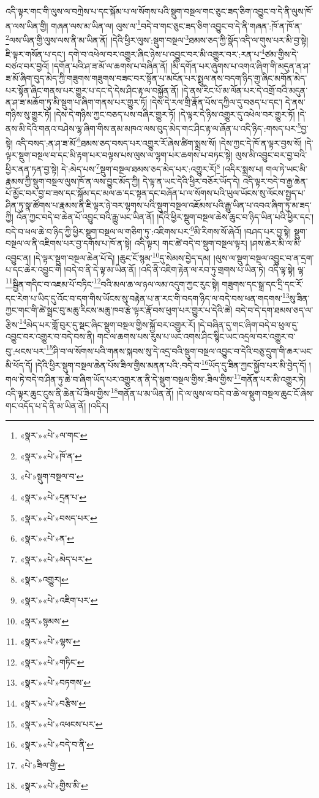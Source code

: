 འདི་ལྟར་གང་གི་ལུས་ལ་བཀྲེས་པ་དང་སྐོམ་པ་ལ་སོགས་པའི་སྡུག་བསྔལ་གང་ཅུང་ཟད་ཅིག་འབྱུང་བ་དེ་ནི་ལུས་ཁོ་ན་ལས་ཡིན་གྱི། གཞན་ལས་མ་ཡིན་ལ། ལུས་ལ་\footnote{«སྣར་»«པེ་»ལ་གང་}བདེ་བ་གང་ཅུང་ཟད་ཅིག་འབྱུང་བ་དེ་ནི་གཞན་:ཁོ་ན་ཁོ་ན་\footnote{«སྣར་»«པེ་»ཁོ་ན་}ལས་ཡིན་གྱི་ལུས་ལས་ནི་མ་ཡིན་ནོ། །དེའི་ཕྱིར་ལུས་:སྡུག་བསྔལ་\footnote{«པེ་»སྡུག་བསྔལ་བ་}ཐམས་ཅད་ཀྱི་སྣོད་འདི་ལ་གུས་པར་མི་བྱ་སྟེ། ཇི་ལྟར་གསོན་པ་དང་། དགེ་བ་འཕེལ་བར་འགྱུར་ཞིང་ཉེས་པ་འབྱུང་བར་མི་འགྱུར་བར་:རན་པ་\footnote{«སྣར་»«པེ་»དྲན་པ་}ཙམ་གྱིས་དེ་བཙའ་བར་བྱའོ། །དགོན་པའི་ཤ་ཟ་མོ་ལ་ཆགས་པ་བཞིན་ནོ། །མི་དགོན་པར་ཞུགས་པ་འགའ་ཞིག་གི་མདུན་ན་ཤ་ཟ་མོ་ཞིག་བུད་མེད་ཀྱི་གཟུགས་གཟུགས་བཟང་བར་སྟོན་པ་མངོན་པར་སྤྲུལ་ནས་བདག་ཉིད་གྱ་ཞིང་མགོན་མེད་པར་སྟོན་ཞིང་གནས་པར་གྱུར་པ་དང་དེ་དེས་ཤིང་རྟ་ལ་བསྐྱོན་ནོ། །དེ་ནས་རིང་པོ་མ་ལོན་པར་དེ་འགྲོ་བའི་མདུན་ན་ཤ་ཟ་མཆོག་ཏུ་མི་སྡུག་པ་ཞིག་གནས་པར་གྱུར་ཏོ། །དེས་དེ་རལ་གྲི་རྣོན་པོས་དཀྱིལ་དུ་བཅད་པ་དང་། དེ་ནས་གཉིས་སུ་གྱུར་ཏོ། །དེས་དེ་གཉིས་ཀྱང་བཅད་པས་བཞིར་གྱུར་ཏོ། །དེ་ལྟར་དེ་ཉིས་འགྱུར་དུ་འཕེལ་བར་གྱུར་ཏོ། །དེ་ནས་མི་དེའི་གནའ་བཤེས་ལྷ་ཞིག་གིས་ནམ་མཁའ་ལས་བུད་མེད་གང་ཤིང་རྟ་ལ་ཞོན་པ་འདི་ཉིད་:གསད་པར་\footnote{«སྣར་»«པེ་»བསད་པར་}བྱ་སྟེ། འདི་བསད་:ན་ཤ་ཟ་མོ་\footnote{«སྣར་»«པེ་»ན་}ཐམས་ཅད་བསད་པར་འགྱུར་རོ་ཞེས་ཚིག་སྨྲས་སོ། །དེས་ཀྱང་དེ་ཁོ་ན་ལྟར་བྱས་སོ། །དེ་ལྟར་སྡུག་བསྔལ་བ་དང་མི་རྟག་པར་བལྟས་པས་ལུས་ལ་ལྷག་པར་ཆགས་པ་བཏང་སྟེ། ལུས་མི་འབྱུང་བར་བྱ་བའི་ཕྱིར་ནན་ཏན་བྱ་སྟེ། དེ་:མེད་པས་\footnote{«སྣར་»«པེ་»མེད་པར་}སྡུག་བསྔལ་ཐམས་ཅད་མེད་པར་:འགྱུར་རོ།\footnote{«སྣར་»འགྱུར།} །འདིར་སྨྲས་པ། གལ་ཏེ་ཡང་མི་རྣམས་ཀྱི་སྡུག་བསྔལ་ལུས་ཁོ་ན་ལས་བྱུང་མོད་ཀྱི། དེ་ལྟ་ན་ཡང་དེའི་ཕྱིར་བཅོར་ཡོད་དེ། འདི་ལྟར་བདེ་བ་རྒྱ་ཆེན་པོ་མྱོང་བར་བྱ་བ་ཟས་དང་སྐོམ་དང་མལ་ཆ་དང་སྟན་དང་བཞོན་པ་ལ་སོགས་པའི་ཡུལ་ཡོངས་སུ་ལོངས་སྤྱད་པ་ཤིན་ཏུ་སྣ་ཚོགས་པ་རྣམས་ནི་ཇི་ལྟར་ཉེ་བར་ལྷགས་པའི་སྡུག་བསྔལ་འཇོམས་པའི་རྒྱུ་ཡིན་པ་འབའ་ཞིག་ཏུ་མ་ཟད་ཀྱི། འོན་ཀྱང་བདེ་བ་ཆེན་པོ་འབྱུང་བའི་རྒྱུ་ཡང་ཡིན་ནོ། །དེའི་ཕྱིར་སྡུག་བསྔལ་ཆེས་ཆུང་བ་ཉིད་ཡིན་པའི་ཕྱིར་དང་། བདེ་བ་ཕལ་ཆེ་བ་ཉིད་ཀྱི་ཕྱིར་སྡུག་བསྔལ་ལ་གཅིག་ཏུ་:འཇིགས་པར་\footnote{«སྣར་»«པེ་»འཇིག་པར་}མི་རིགས་སོ་ཞེའོ། །བཤད་པར་བྱ་སྟེ། སྡུག་བསྔལ་ལ་ནི་འཇིགས་པར་བྱ་དགོས་པ་ཁོ་ན་སྟེ། འདི་ལྟར། གང་ཚེ་བདེ་བ་སྡུག་བསྔལ་ལྟར། །ཤས་ཆེར་མི་ལ་མི་འབྱུང་ན། །དེ་ལྟར་སྡུག་བསྔལ་ཆེན་པོ་དེ། །ཆུང་ངོ་སྙམ་\footnote{«སྣར་»སྙམས་}དུ་སེམས་བྱེད་དམ། །ལུས་ལ་སྡུག་བསྔལ་འབྱུང་བ་ན་དྲག་པ་དང་ཆེར་འབྱུང་གི །བདེ་བ་ནི་དེ་ལྟ་མ་ཡིན་ནོ། །འདི་ནི་འཇིག་རྟེན་ལ་རབ་ཏུ་གྲགས་པ་ཡིན་ཏེ། འདི་ལྟ་སྟེ། ལྷ་\footnote{«སྣར་»«པེ་»ལྷས་}སྦྱིན་གདིང་བ་འཇམ་པོ་བཏིང་\footnote{«སྣར་»«པེ་»གཏིང་}བའི་མལ་ཆ་ལ་ཉལ་ལམ་འདུག་ཀྱང་རུང་སྟེ། གཟུགས་དང་སྒྲ་དང་དྲི་དང་རོ་དང་རེག་པ་ཡིད་དུ་འོང་བ་དག་གིས་ཡོངས་སུ་བརྟེན་པ་ན་རང་གི་བདག་ཉིད་ལ་བདེ་བས་ཕན་གདགས་\footnote{«སྣར་»«པེ་»བཏགས་}སུ་ཟིན་ཀྱང་གང་གི་ཚེ་སྦྲང་བུ་མཆུ་རིངས་མཆུ་ཁབ་རྩེ་ལྟར་རྣོ་བས་ཕུག་པར་གྱུར་པ་དེའི་ཚེ། བདེ་བ་དེ་དག་ཐམས་ཅད་ལ་རྩིས་\footnote{«སྣར་»«པེ་»བརྩིས་}མེད་པར་གློ་བུར་དུ་སྡང་ཞིང་སྡུག་བསྔལ་གྱིས་སྐྱོ་བར་འགྱུར་རོ། །དེ་བཞིན་དུ་གང་ཞིག་བདེ་བ་ཕུལ་དུ་འབྱུང་བར་འགྱུར་བ་བདེ་བས་ནི། གང་ལ་ཆགས་པས་རུས་པ་ཡང་འགས་ཤིང་སྙིང་ཡང་འདྲལ་བར་འགྱུར་བ་བུ་:ཕངས་པར་\footnote{«སྣར་»«པེ་»འཕངས་པར་}ཤི་བ་ལ་སོགས་པའི་གནས་སྐབས་སུ་དེ་འདྲ་བའི་སྡུག་བསྔལ་འབྱུང་བ་དེའི་བཅུ་དྲུག་གི་ཆར་ཡང་མི་ཕོད་དོ། །དེའི་ཕྱིར་སྡུག་བསྔལ་ཆེན་པོས་ཟིལ་གྱིས་མནན་པའི་:བདེ་བ་\footnote{«སྣར་»«པེ་»བདེ་བ་ནི་}ཡོད་དུ་ཟིན་ཀྱང་སྐྱོབ་པར་མི་བྱེད་དོ། །གལ་ཏེ་བདེ་བ་ཤིན་ཏུ་ཆེ་བ་ཞིག་ཡོད་པར་འགྱུར་ན་ནི་དེ་སྡུག་བསྔལ་གྱིས་:ཟིལ་གྱིས་\footnote{«པེ་»ཟིལ་གྱི་}གནོན་པར་མི་འགྱུར་ཏེ། འདི་ལྟར་ཆུང་ངུས་ནི་ཆེན་པོ་ཟིལ་གྱིས་\footnote{«སྣར་»«པེ་»གྱིས་མི་}གནོན་པ་མ་ཡིན་ནོ། །དེ་ལ་ལུས་ལ་བདེ་བ་ཆེ་ལ་སྡུག་བསྔལ་ཆུང་ངོ་ཞེས་གང་འདོད་པ་དེ་ནི་མ་ཡིན་ནོ། །འདིར། 